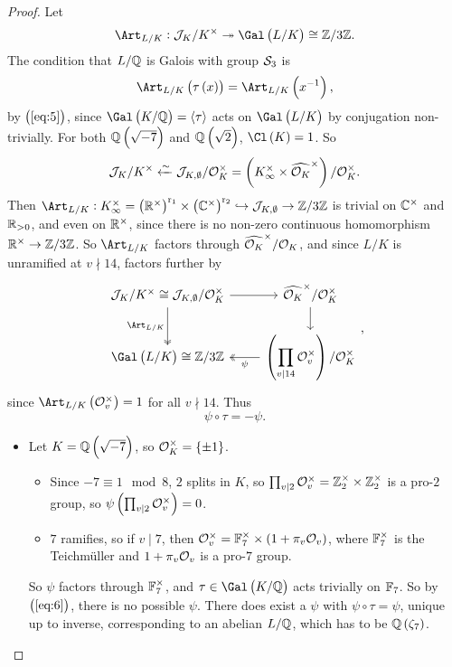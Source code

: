 \begin{proof}
Let
$$ \Art_{L / K} : \JJJ_K / K^\times \twoheadrightarrow \Gal\br{L / K} \cong \ZZ / 3\ZZ. $$
The condition that $ L / \mathbb{Q} $ is Galois with group $ \mathcal{S}_3 $ is
$$ \Art_{L / K}\br{\tau\br{x}} = \Art_{L / K}\br{x^{-1}}, $$
by $ \br{\ref{eq:5}} $, since $ \Gal\br{K / \QQ} = \abr{\tau} $ acts on $ \Gal\br{L / K} $ by conjugation non-trivially. For both $ \QQ\br{\sqrt{-7}} $ and $ \QQ\br{\sqrt{2}} $, $ \Cl\br{K} = 1 $. So
$$ \JJJ_K / K^\times \xleftarrow{\sim} \JJJ_{K, \emptyset} / \OOO_K^\times = \br{K_\infty^\times \times \widehat{\OOO_K}^\times} / \OOO_K^\times. $$
Then $ \Art_{L / K} : K_\infty^\times = \br{\RR^\times}^{\r_1} \times \br{\CC^\times}^{\r_2} \hookrightarrow \JJJ_{K, \emptyset} \to \ZZ / 3\ZZ $ is trivial on $ \mathbb{C}^\times $ and $ \mathbb{R}_{> 0} $, and even on $ \mathbb{R}^\times $, since there is no non-zero continuous homomorphism $ \mathbb{R}^\times \to \mathbb{Z} / 3\mathbb{Z} $. So $ \Art_{L / K} $ factors through $ \widehat{\mathcal{O}_K}^\times / \mathcal{O}_K $, and since $ L / K $ is unramified at $ v \nmid 14 $, factors further by
$$
\begin{tikzcd}
\JJJ_K / K^\times \cong \JJJ_{K, \emptyset} / \OOO_K^\times \arrow{r} \arrow[twoheadrightarrow]{d}[swap]{\Art_{L / K}} & \widehat{\OOO_K}^\times / \OOO_K^\times \arrow{d} \\
\Gal\br{L / K} \cong \ZZ / 3\ZZ & \br{\displaystyle\prod_{v \mid 14} \OOO_v^\times} / \OOO_K^\times \arrow[twoheadrightarrow]{l}{\psi}
\end{tikzcd},
$$
since $ \Art_{L / K}\br{\OOO_v^\times} = 1 $ for all $ v \nmid 14 $. Thus
\begin{equation}
\label{eq:6}
\psi \circ \tau = -\psi.
\end{equation}
\begin{itemize}
\item Let $ K = \QQ\br{\sqrt{-7}} $, so $ \OOO_K^\times = \cbr{\pm 1} $.
\begin{itemize}
\item Since $ -7 \equiv 1 \mod 8 $, $ 2 $ splits in $ K $, so $ \prod_{v \mid 2} \mathcal{O}_v^\times = \mathbb{Z}_2^\times \times \mathbb{Z}_2^\times $ is a pro-$ 2 $ group, so $ \psi\br{\prod_{v \mid 2} \OOO_v^\times} = 0 $.
\item $ 7 $ ramifies, so if $ v \mid 7 $, then $ \OOO_v^\times = \FF_7^\times \times \br{1 + \pi_v\OOO_v} $, where $ \mathbb{F}_7^\times $ is the Teichm\"uller and $ 1 + \pi_v\mathcal{O}_v $ is a pro-$ 7 $ group.
\end{itemize}
So $ \psi $ factors through $ \mathbb{F}_7^\times $, and $ \tau \in \Gal\br{K / \QQ} $ acts trivially on $ \mathbb{F}_7 $. So by $ \br{\ref{eq:6}} $, there is no possible $ \psi $. There does exist a $ \psi $ with $ \psi \circ \tau = \psi $, unique up to inverse, corresponding to an abelian $ L / \mathbb{Q} $, which has to be $ \QQ\br{\zeta_7} $.

\end{itemize}
\end{proof}
